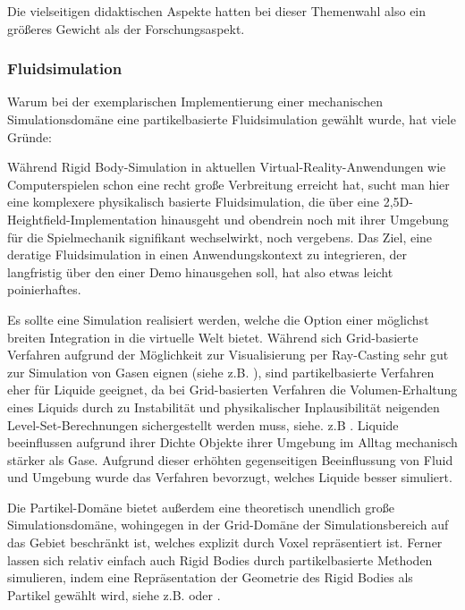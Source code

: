 Die vielseitigen didaktischen Aspekte hatten bei dieser Themenwahl also ein größeres Gewicht als der Forschungsaspekt. 


\subsubsection{Fluidsimulation}

Warum bei der exemplarischen Implementierung einer mechanischen Simulationsdomäne eine partikelbasierte Fluidsimulation 
gewählt wurde, hat viele Gründe:

Während Rigid Body-Simulation in aktuellen Virtual-Reality-Anwendungen wie Computerspielen schon eine recht große Verbreitung erreicht hat, sucht man hier eine komplexere physikalisch basierte Fluidsimulation, die über eine 
2,5D- Heightfield-Implementation hinausgeht und obendrein noch mit ihrer Umgebung für die Spielmechanik signifikant
wechselwirkt, noch vergebens. 
Das Ziel, eine deratige Fluidsimulation in einen Anwendungskontext zu integrieren, der langfristig über den einer Demo hinausgehen soll, hat also etwas leicht poinierhaftes.

Es sollte eine Simulation realisiert werden, welche die Option einer möglichst breiten Integration in die virtuelle Welt bietet. Während sich Grid-basierte Verfahren aufgrund der Möglichkeit zur Visualisierung per Ray-Casting sehr gut zur Simulation von Gasen eignen (siehe z.B. \cite{Peschel2009}), 
sind partikelbasierte Verfahren eher für Liquide geeignet, da bei Grid-basierten Verfahren die Volumen-Erhaltung eines Liquids durch zu Instabilität und physikalischer Inplausibilität neigenden Level-Set-Berechnungen sichergestellt werden muss, siehe. z.B \cite{CraneLlamas2007}. 
Liquide beeinflussen aufgrund ihrer Dichte Objekte ihrer Umgebung im Alltag mechanisch stärker als Gase. 
Aufgrund dieser erhöhten gegenseitigen Beeinflussung von Fluid und Umgebung wurde das Verfahren bevorzugt,
welches Liquide besser simuliert.

Die Partikel-Domäne bietet außerdem eine theoretisch unendlich große Simulationsdomäne, wohingegen in der Grid-Domäne der Simulationsbereich auf das Gebiet beschränkt ist, welches explizit durch Voxel repräsentiert ist.
Ferner lassen sich relativ einfach auch Rigid Bodies durch partikelbasierte Methoden simulieren,
indem eine Repräsentation der Geometrie des Rigid Bodies als Partikel gewählt wird, 
siehe z.B. \cite{Steil2007} oder \cite{Harada2007}.


